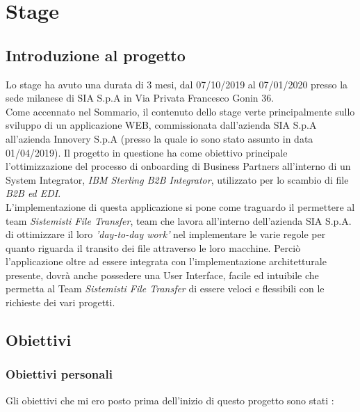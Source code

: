 \chapter{Stage}
\label{chap:stage}


\section{Introduzione al progetto}
\label{sec:introstage}
Lo stage ha avuto una durata di 3 mesi, dal 07/10/2019 al 07/01/2020 presso la sede milanese di SIA S.p.A in Via Privata Francesco Gonin 36. \\

Come accennato nel Sommario, il contenuto dello stage verte principalmente sullo sviluppo di un applicazione WEB, commissionata dall'azienda SIA S.p.A all'azienda Innovery S.p.A (presso la quale io sono stato assunto in data 01/04/2019). Il progetto in questione ha come obiettivo principale l'ottimizzazione del processo di onboarding di Business Partners all'interno di un System Integrator, \textit{IBM Sterling B2B Integrator}, utilizzato per lo scambio di file \textit{B2B ed EDI}. \\

L'implementazione di questa applicazione si pone come traguardo il permettere al team \textit{Sistemisti File Transfer}, team che lavora all'interno dell'azienda SIA S.p.A. di ottimizzare il loro \textit{'day-to-day work'} nel implementare le varie regole per quanto riguarda il transito dei file attraverso le loro macchine. Perciò l'applicazione oltre ad essere integrata con l'implementazione architetturale presente, dovrà anche possedere una User Interface, facile ed intuibile che permetta al Team \textit{Sistemisti File Transfer} di essere veloci e flessibili con le richieste dei vari progetti. \\



\section{Obiettivi}
\label{sec:obiettivi}


\subsection{Obiettivi personali}
\label{subsec:obiettivipersonali}

Gli obiettivi che mi ero posto prima dell'inizio di questo progetto sono stati :

